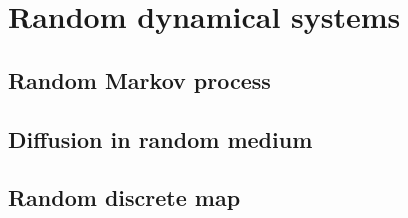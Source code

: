 \documentclass[reprint,prx]{revtex4-1}
\renewcommand{\=}[1]{\stackrel{#1}{=}} %
\renewcommand{\(}{\left (}
\renewcommand{\)}{\right  )}
\renewcommand{\[}{\left [}
\renewcommand{\]}{\right ]}
\newcommand{\<}{\left <}
\renewcommand{\>}{\right >}
\theoremstyle{definition}
\theoremstyle{remark}
\begin{document}
\section{Random dynamical systems}
\subsection{Random Markov process} \label{app:randMarkov}
\subsection{Diffusion in random medium}
\subsection{Random discrete map}


%

\end{document}
